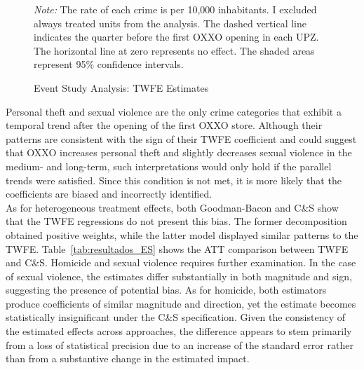 \documentclass[12pt]{article}
\begin{document}
\begin{figure}[htbp]
    \caption{Event Study Analysis: TWFE Estimates}
    \label{fig:fourpanelESFE}
    \vspace{0.1cm}
    \footnotesize{\textit{Note:} The rate of each crime is per 10,000 inhabitants. 
                        I excluded always treated units from the analysis. 
                        The dashed vertical line indicates the quarter before the first OXXO opening in each UPZ. 
                        The horizontal line at zero represents no effect. The shaded areas represent 95\% confidence intervals.}
\end{figure}

Personal theft and sexual violence are the only crime categories that exhibit a temporal trend after the opening of the first OXXO store. Although their patterns are consistent with the sign of their TWFE coefficient and could suggest that OXXO increases personal theft and slightly decreases sexual violence in the medium- and long-term, such interpretations would only hold if the parallel trends were satisfied. Since this condition is not met, it is more likely that the coefficients are biased and incorrectly identified. \\

As for heterogeneous treatment effects, both Goodman-Bacon and C\&S show that the TWFE regressions do not present this bias. The former decomposition obtained positive weights, while the latter model displayed similar patterns to the TWFE. Table~\ref{tab:resultados_ES} shows the ATT comparison between TWFE and C\&S. Homicide and sexual violence requires further examination. In the case of sexual violence, the estimates differ substantially in both magnitude and sign, suggesting the presence of potential bias. As for homicide, both estimators produce coefficients of similar magnitude and direction, yet the estimate becomes statistically insignificant under the C\&S specification. Given the consistency of the estimated effects across approaches, the difference appears to stem primarily from a loss of statistical precision due to an increase of the standard error rather than from a substantive change in the estimated impact.\\
\end{document}
